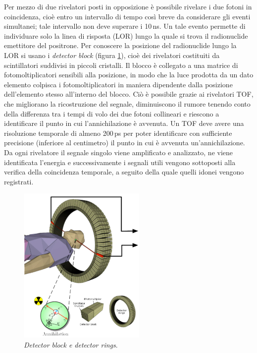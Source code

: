 \documentclass{report}
\newcommand{\figref}[1]{figura \ref{#1}}
\numberwithin{equation}{section}
\numberwithin{figure}{section}
\begin{document}
Per mezzo di due rivelatori posti in opposizione è possibile rivelare i due fotoni in coincidenza, cioè entro un intervallo di tempo così breve da considerare gli eventi simultanei; tale intervallo non deve superare i 10\,ns. Un tale evento permette di individuare solo la linea di risposta (LOR) lungo la quale si trova il radionuclide emettitore del positrone. Per conoscere la posizione del radionuclide lungo la LOR si usano i \textit{detector block} (\figref{fig:detector}), cioè dei rivelatori costituiti da scintillatori suddivisi in piccoli cristalli. Il blocco è collegato a una matrice di fotomoltiplicatori sensibili alla posizione, in modo che la luce prodotta da un dato elemento colpisca i fotomoltiplicatori in maniera dipendente dalla posizione dell'elemento stesso all'interno del blocco. Ciò è possibile grazie ai rivelatori TOF, che migliorano la ricostruzione del segnale, diminuiscono il rumore tenendo conto della differenza tra i tempi di volo dei due fotoni collineari e riescono a identificare il punto in cui l'annichilazione è avvenuta. Un TOF deve avere una risoluzione temporale di almeno 200\,ps per poter identificare con sufficiente precisione (inferiore al centimetro) il punto in cui è avvenuta un'annichilazione. Da ogni rivelatore il segnale singolo viene amplificato e analizzato, ne viene identificata l’energia e successivamente i segnali utili vengono sottoposti alla verifica della coincidenza temporale, a seguito della quale quelli idonei vengono registrati.

\begin{figure}
    \centering
    \includegraphics[width=0.55\textwidth]{immagini/detector.png}
    \caption{\textit{Detector block e detector rings}.}
    \label{fig:detector}
\end{figure}
\end{document}
